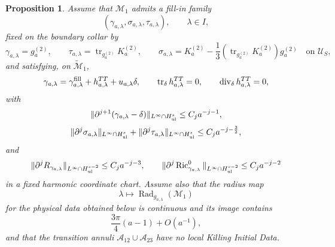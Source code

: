 \documentclass{amsart}
\newtheorem{proposition}{Proposition}[section]
\begin{document}
{\begin{proposition}
\noindent Assume that \(\mathcal M_1\) admits a fill-in family
\[
        (\gamma_{a,\lambda},\sigma_{a,\lambda},\tau_{a,\lambda}),
        \qquad \lambda\in I,
\]
fixed on the boundary collar by
\[
        \gamma_{a,\lambda}=g_a^{(2)},\qquad
        \tau_{a,\lambda}=\operatorname{tr}_{g_a^{(2)}}K_a^{(2)},\qquad
        \sigma_{a,\lambda}=K_a^{(2)}
        -\frac13(\operatorname{tr}_{g_a^{(2)}}K_a^{(2)})g_a^{(2)}
        \quad\text{on }\mathcal U_S,
\]
and satisfying, on \(\widetilde{\mathcal M}_1\),
\[
        \gamma_{a,\lambda}
        =
        \gamma^{\rm fill}_{a,\lambda}
        +
        h^{TT}_{a,\lambda}
        +
        u_{a,\lambda}\delta,
        \qquad
        \operatorname{tr}_{\delta}h^{TT}_{a,\lambda}=0,
        \qquad
        \operatorname{div}_{\delta}h^{TT}_{a,\lambda}=0,
\]
with
\[
        \|\partial^{j+1}(\gamma_{a,\lambda}-\delta)\|_{L^\infty\cap H^s_{\rm ul}}
        \le C_j a^{-j-1},
\]
\[
        \|\partial^j\sigma_{a,\lambda}\|_{L^\infty\cap H^s_{\rm ul}}
        +
        \|\partial^j\tau_{a,\lambda}\|_{L^\infty\cap H^s_{\rm ul}}
        \le C_j a^{-j-\frac32},
\]
and
\[
        \|\partial^j R_{\gamma_{a,\lambda}}\|_{L^\infty\cap H^{s-2}_{\rm ul}}
        \le C_j a^{-j-3},
        \qquad
        \|\partial^j\operatorname{Ric}^{0}_{\gamma_{a,\lambda}}\|_{L^\infty\cap H^{s-2}_{\rm ul}}
        \le C_j a^{-j-2}
\]
in a fixed harmonic coordinate chart.
Assume also that the radius map
\[
        \lambda\mapsto \operatorname{Rad}_{g_{a,\lambda}}(\mathcal M_1)
\]
for the physical data obtained below is continuous and its image contains
\[
        \frac{3\pi}{4}(a-1)+O(a^{-1}),
\]
and that the transition annuli \(\mathcal A_{12}\cup\mathcal A_{23}\)
have no local Killing Initial Data.


\end{proposition}}
\end{document}
